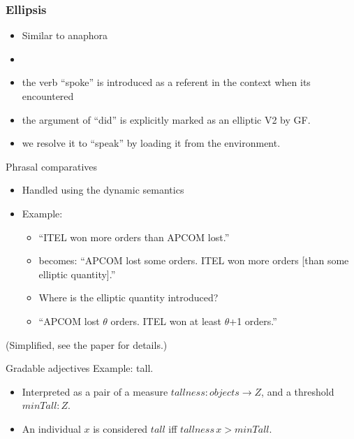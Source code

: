\documentclass[11pt]{beamer}
\begin{document}
\begin{frame}
  \frametitle{Ellipsis}
  \begin{itemize}
  \item Similar to anaphora
  \item
  \item the verb ``spoke'' is introduced as a referent in the context when its encountered
  \item the argument of ``did'' is explicitly marked as an elliptic V2 by GF.
  \item we resolve it to ``speak'' by loading it from the environment.
  \end{itemize}
\end{frame}


\begin{frame}{Phrasal comparatives}
  \begin{itemize}
  \item Handled using the dynamic semantics
  \item Example:
    \begin{itemize}
    \item ``ITEL won more orders than APCOM lost.''
    \item becomes: ``APCOM lost some orders. ITEL won more
      orders [than some elliptic quantity].''
    \item Where is the elliptic quantity introduced?
    \item ``APCOM lost $\theta$ orders.  ITEL won at least $\theta$+1 orders.''
    \end{itemize}
  \end{itemize}
  (Simplified, see the paper for details.)
\end{frame}

\begin{frame}{Gradable adjectives}
  Example: tall.
  \begin{itemize}
  \item Interpreted as a pair of a measure $tallness : objects \to Z$, and a threshold $minTall : Z$.
    \item An individual $x$ is considered $tall$ iff $tallness\, x > minTall$.
  \end{itemize}
\end{frame}
\end{document}
